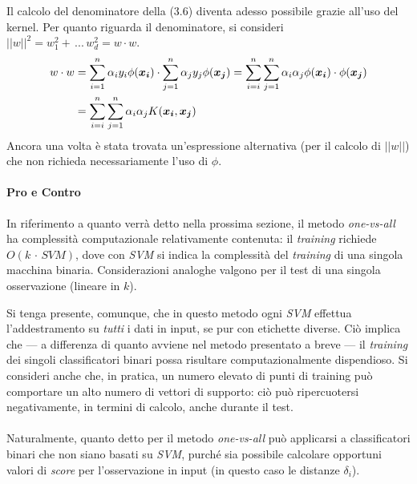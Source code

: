 Il calcolo del denominatore della (3.6) diventa adesso possibile grazie all'uso del kernel. Per quanto riguarda il denominatore, si consideri $||w||^2 = w_1^2 + \, ... \, w_d^2 = w \cdot w$. 
\begin{equation}
\begin{split}
	w \cdot w &= \sum\limits_{i = 1}^{n} {\alpha_i y_i \phi(\boldsymbol{x_i})} \cdot \sum\limits_{j = 1}^{n} {\alpha_j y_j \phi(\boldsymbol{x_j})} = \sum\limits_{i = i}^{n} { \sum\limits_{j = 1}^{n}{\alpha_i \alpha_j \phi(\boldsymbol{x_i}) \cdot \phi(\boldsymbol{x_j})} }
	\\ &= \sum\limits_{i = i}^{n} { \sum\limits_{j = 1}^{n} {\alpha_i \alpha_j K(\boldsymbol{x_i}, \boldsymbol{x_j})} }
\end{split}
\vspace{2mm}
\end{equation}
Ancora una volta è stata trovata un'espressione alternativa (per il calcolo di $||w||$) che non richieda necessariamente l'uso di $\phi$.

\paragraph{Pro e Contro}
In riferimento a quanto verrà detto nella prossima sezione, il metodo \textit{one-vs-all} ha complessità computazionale relativamente contenuta: il \textit{training} richiede $O(k \, \cdot \, SVM)$, dove con \textit{SVM} si indica la complessità del \textit{training} di una singola macchina binaria. Considerazioni analoghe valgono per il test di una singola osservazione (lineare in $k$). 

Si tenga presente, comunque, che in questo metodo ogni \textit{SVM} effettua l'addestramento su \textit{tutti} i dati in input, se pur con etichette diverse. Ciò implica che --- a differenza di quanto avviene nel metodo presentato a breve --- il \textit{training} dei singoli classificatori binari possa risultare computazionalmente dispendioso. Si consideri anche che, in pratica, un numero elevato di punti di training può comportare un alto numero di vettori di supporto: ciò può ripercuotersi negativamente, in termini di calcolo, anche durante il test.

\paragraph{}
Naturalmente, quanto detto per il metodo \textit{one-vs-all} può applicarsi a classificatori binari che non siano basati su \textit{SVM}, purché sia possibile calcolare opportuni valori di \textit{score} per l'osservazione in input (in questo caso le distanze $\delta_i$).

